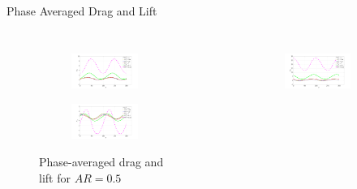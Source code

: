 \documentclass[aspectratio=169,xcolor=dvipsnames]{beamer}
\begin{document}
\begin{frame}{Phase Averaged Drag and Lift}
    \begin{columns}[c]
        \begin{figure}
            \centering
            \begin{subfigure}[b]{.49\textwidth}
                \includegraphics[width=\textwidth]{figures/padrag0p5.pdf}
            \end{subfigure}
            \begin{subfigure}[b]{.49\textwidth}
                \includegraphics[width=\textwidth]{figures/palift0p5.pdf}
            \end{subfigure}
            \caption{Phase-averaged drag and lift for $AR = 0.5$}
        \end{figure}
        \vspace{-10pt}
        \begin{figure}
            \centering
            \begin{subfigure}[b]{.49\textwidth}
                \includegraphics[width=\textwidth]{figures/padrag1p5.pdf}

\end{subfigure}
\end{figure}
\end{columns}
\end{frame}
\end{document}
